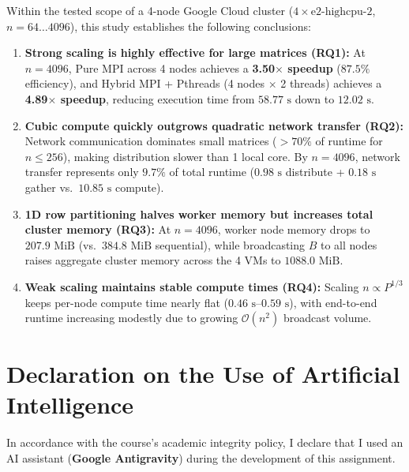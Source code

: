 \documentclass[11pt,a4paper]{article}
\begin{document}
Within the tested scope of a 4-node Google Cloud cluster ($4 \times \text{e2-highcpu-2}$, $n = 64 \dots 4096$), this study establishes the following conclusions:

\begin{enumerate}
    \item \textbf{Strong scaling is highly effective for large matrices (RQ1):} At $n = 4096$, Pure MPI across 4 nodes achieves a \textbf{3.50$\times$ speedup} ($87.5\%$ efficiency), and Hybrid MPI + Pthreads (4 nodes $\times$ 2 threads) achieves a \textbf{4.89$\times$ speedup}, reducing execution time from $58.77\text{ s}$ down to $12.02\text{ s}$.
    \item \textbf{Cubic compute quickly outgrows quadratic network transfer (RQ2):} Network communication dominates small matrices ($>70\%$ of runtime for $n \le 256$), making distribution slower than 1 local core. By $n = 4096$, network transfer represents only $9.7\%$ of total runtime ($0.98\text{ s}$ distribute + $0.18\text{ s}$ gather vs.\ $10.85\text{ s}$ compute).
    \item \textbf{1D row partitioning halves worker memory but increases total cluster memory (RQ3):} At $n = 4096$, worker node memory drops to $207.9\text{ MiB}$ (vs.\ $384.8\text{ MiB}$ sequential), while broadcasting $B$ to all nodes raises aggregate cluster memory across the 4 VMs to $1088.0\text{ MiB}$.
    \item \textbf{Weak scaling maintains stable compute times (RQ4):} Scaling $n \propto P^{1/3}$ keeps per-node compute time nearly flat ($0.46\text{ s}\text{--}0.59\text{ s}$), with end-to-end runtime increasing modestly due to growing $\mathcal{O}(n^2)$ broadcast volume.
\end{enumerate}

\section*{Declaration on the Use of Artificial Intelligence}

In accordance with the course's academic integrity policy, I declare that I used an AI assistant (\textbf{Google Antigravity}) during the development of this assignment.
\end{document}

